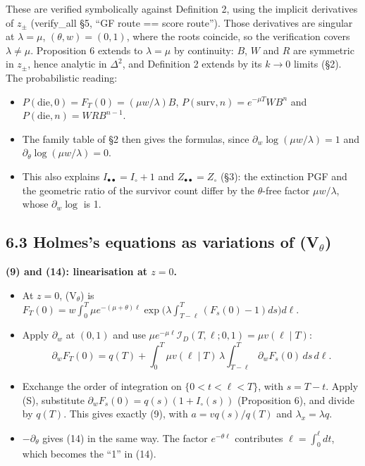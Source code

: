 \documentclass[10pt,]{article}
\providecommand{\tightlist}{%
  \setlength{\itemsep}{0pt}\setlength{\parskip}{0pt}}
\begin{document}
These are verified symbolically against Definition 2, using the implicit
derivatives of \(z_\pm\) (verify\_all §5, ``GF route == score route'').
Those derivatives are singular at \(\lambda=\mu\), \((\theta,w)=(0,1)\),
where the roots coincide, so the verification covers \(\lambda\ne\mu\).
Proposition 6 extends to \(\lambda=\mu\) by continuity: \(B\), \(W\) and
\(R\) are symmetric in \(z_\pm\), hence analytic in \(\Delta^2\), and
Definition 2 extends by its \(k\to0\) limits (§2). The probabilistic
reading:

\begin{itemize}
\tightlist
\item
  \(P(\text{die},0)=F_T(0)=(\mu w/\lambda)B\),
  \(P(\text{surv},n)=e^{-\mu T}WB^n\) and \(P(\text{die},n)=WRB^{n-1}\).
\item
  The family table of §2 then gives the formulas, since
  \(\partial_w\log(\mu w/\lambda)=1\) and
  \(\partial_\theta\log(\mu w/\lambda)=0\).
\item
  This also explains \(I_{\bullet\bullet}=I_\circ+1\) and
  \(Z_{\bullet\bullet}=Z_\circ\) (§3): the extinction PGF and the
  geometric ratio of the survivor count differ by the \(\theta\)-free
  factor \(\mu w/\lambda\), whose \(\partial_w\log\) is 1.
\end{itemize}

\hypertarget{holmess-equations-as-variations-of-v_theta}{%
\subsection{\texorpdfstring{6.3 Holmes's equations as variations of
(V\(_\theta\))}{6.3 Holmes's equations as variations of (V\_\textbackslash{}theta)}}\label{holmess-equations-as-variations-of-v_theta}}

\textbf{(9) and (14): linearisation at \(z=0\).}

\begin{itemize}
\tightlist
\item
  At \(z=0\), (V\(_\theta\)) is
  \(F_T(0)=w\int_0^T\mu e^{-(\mu+\theta)\ell}\exp\big(\lambda\int_{T-\ell}^T(F_s(0)-1)ds\big)d\ell\).
\item
  Apply \(\partial_w\) at \((0,1)\) and use
  \(\mu e^{-\mu\ell}\mathcal I_D(T,\ell;0,1)=\mu v(\ell\mid T)\):
  \[\partial_wF_T(0)=q(T)+\int_0^T\mu v(\ell\mid T)\,\lambda\!\int_{T-\ell}^T\partial_wF_{s}(0)\,ds\,d\ell .\]
\item
  Exchange the order of integration on \(\{0<t<\ell<T\}\), with
  \(s=T-t\). Apply (S), substitute
  \(\partial_wF_s(0)=q(s)(1+I_\circ(s))\) (Proposition 6), and divide by
  \(q(T)\). This gives exactly (9), with \(a=vq(s)/q(T)\) and
  \(\lambda_x=\lambda q\).
\item
  \(-\partial_\theta\) gives (14) in the same way. The factor
  \(e^{-\theta\ell}\) contributes \(\ell=\int_0^\ell dt\), which becomes
  the ``1'' in (14).
\end{itemize}
\end{document}
